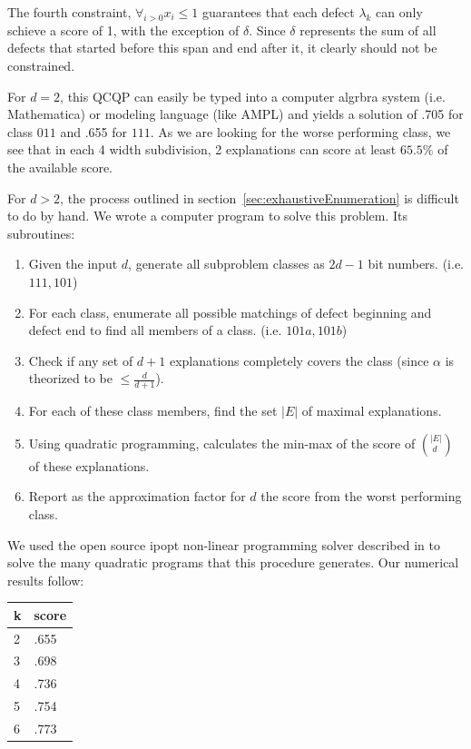 The fourth constraint, $\forall_{i>0} x_i \leq 1$ guarantees that each defect $\lambda_k$ can only schieve a score of 1, with the exception of $\delta$. Since $\delta$ represents the sum of all defects that started before this span and end after it, it clearly should not be constrained.

For $d=2$, this QCQP can easily be typed into a computer algrbra system (i.e. Mathematica) or modeling language (like AMPL) and yields a solution of .705 for class $011$ and .655 for $111$.  As we are looking for the worse performing class, we see that in each 4 width subdivision, 2 explanations can score at least $65.5\%$ of the available score.

For $d > 2$, the process outlined in section~\ref{sec:exhaustiveEnumeration} is difficult to do by hand.  We wrote a computer program to solve this problem. Its subroutines:

\begin{enumerate}
\item Given the input $d$, generate all subproblem classes as $2d-1$ bit numbers.  (i.e. $111, 101$)
\item For each class, enumerate all possible matchings of defect beginning and defect end to find all members of a class. (i.e. $101a, 101b$)
\item Check if any set of $d+1$ explanations completely covers the class (since $\alpha$ is theorized to be $\leq \frac{d}{d+1}$).
\item For each of these class members, find the set $|E|$ of maximal explanations.  
\item Using quadratic programming, calculates the min-max of the score of $(^{|E|}_{\hspace{3pt}d})$ of these explanations.
\item Report as the approximation factor for $d$ the score from the worst performing class.
\end{enumerate}

We used the open source ipopt non-linear programming solver described in \cite{wachter2006implementation} to solve the many quadratic programs that this procedure generates.  Our numerical results follow:

\begin{tabular}{l|l}
k & score \\ \hline
2 & .655 \\ 
3 & .698 \\
4 & .736 \\
5 & .754 \\
6 & .773 \\
\end{tabular}

